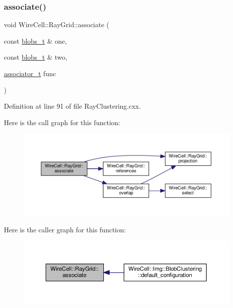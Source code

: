 \subsubsection{\texorpdfstring{associate()}{associate()}}
{\footnotesize\ttfamily void Wire\+Cell\+::\+Ray\+Grid\+::associate (\begin{DoxyParamCaption}\item[{const \hyperlink{namespace_wire_cell_1_1_ray_grid_aea2069aff62790df3241ee7446e81ade}{blobs\+\_\+t} \&}]{one,  }\item[{const \hyperlink{namespace_wire_cell_1_1_ray_grid_aea2069aff62790df3241ee7446e81ade}{blobs\+\_\+t} \&}]{two,  }\item[{\hyperlink{namespace_wire_cell_1_1_ray_grid_a7441e06379a2aef6996c5fae438b797a}{associator\+\_\+t}}]{func }\end{DoxyParamCaption})}



Definition at line 91 of file Ray\+Clustering.\+cxx.

Here is the call graph for this function\+:
\nopagebreak
\begin{figure}[H]
\begin{center}
\leavevmode
\includegraphics[width=350pt]{namespace_wire_cell_1_1_ray_grid_adc5b10091f5718c87dd256f3898a2740_cgraph}
\end{center}
\end{figure}
Here is the caller graph for this function\+:
\nopagebreak
\begin{figure}[H]
\begin{center}
\leavevmode
\includegraphics[width=350pt]{namespace_wire_cell_1_1_ray_grid_adc5b10091f5718c87dd256f3898a2740_icgraph}
\end{center}
\end{figure}
\mbox{\label{namespace_wire_cell_1_1_ray_grid_a11febee1f22df148439d0782ffb754f4}} 
